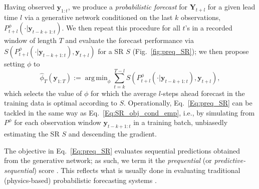 \documentclass[twoside,11pt]{article}
\newcommand{\ddobs}{\mathbf{y}}
\newcommand{\Ddobs}{\mathbf{Y}}
\newcommand{\ddobsupkplusl}{\mathbf{y}_{1:k+l-1}}
\newcommand{\ddobsupT}{\mathbf{y}_{1:T}}
\DeclareMathOperator*{\argmin}{arg\,min}
\begin{document}
	
	Having observed $ \ddobs_{1:t}$, we produce a \textit{probabilistic forecast} for $ \Ddobs_{t+l} $ for a given lead time $ l $ via a generative network conditioned on the last $ k $ observations,
	$ P^\phi_{t+l}(\cdot|\ddobs_{{t-k+1}:t}) $. We then repeat this procedure for all $ t $'s in a recorded window of length $ T $ and evaluate the forecast performance via $ S(P^\phi_{t+l}(\cdot|\ddobs_{t-k+1:t}),\ddobs_{t+l})$ for a SR $ S $ (Fig.~\ref{fig:preq_SR}); we then propose setting $ \phi $ to
	\begin{equation}\label{Eq:preq_SR}
	\hat \phi_T(\ddobsupT) :=\argmin_\phi  \sum\limits_{t=k}^{T-l}S(P^\phi_{t+l}(\cdot|\ddobs_{t-k+1:t}),\ddobs_{t+l}),
	\end{equation}
	which selects the value of $ \phi $ for which the average $ l $-steps ahead forecast in the training data is optimal according to $ S$. Operationally, Eq.~\eqref{Eq:preq_SR} can be tackled in the same way as Eq.~\eqref{Eq:SR_obj_cond_emp}, i.e., by simulating from $ P^\phi $ for each observation window $ \ddobs_{t-k+1:t} $ in a training batch, unbiasedly estimating the SR $ S $ and descending the gradient. 
	
	The objective in Eq.~\eqref{Eq:preq_SR} evaluates sequential predictions obtained from the generative network; as such, we term it the \textit{prequential} (or \textit{predictive-sequential}) score \citep{dawid1984present, dawid2015bayesian}. This reflects what is usually done in evaluating traditional (physics-based) probabilistic forecasting systems \citep{leutbecher2008ensemble, gneiting2014probabilistic}.
	
\end{document}
